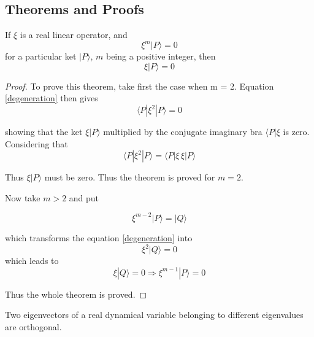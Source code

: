 \subsection{Theorems and Proofs}
\begin{theorem}

If $\xi$ is a real linear operator, and
\begin{equation}
\xi ^m |P \rangle =0
\label{degeneration}
\end{equation}
for a particular ket $|P \rangle$, $m$ being a positive integer, then
\begin{equation*}
\xi |P \rangle =0
\end{equation*}
\label{degenerationtheorem}
\end{theorem}

\begin{proof}

To prove this theorem, take first the case when m = 2. Equation \ref{degeneration} then gives
\begin{equation}
\langle P | \xi ^2 | P \rangle =0
\end{equation}

showing that the ket $\xi|P\rangle$ multiplied by the conjugate imaginary bra $\langle P|\xi$ is zero. Considering that 
\begin{equation*}
\langle P | \xi ^2 | P \rangle  =  \langle P | \xi \, \xi | P \rangle
\end{equation*}

Thus $\xi|P\rangle$ must be zero. Thus the theorem is proved for $m = 2$.

Now take $m > 2$ and put

\begin{equation*}
\xi ^{m-2} | P \rangle = |Q \rangle
\end{equation*}

which transforms the equation \ref{degeneration} into
\begin{equation*}
\xi ^2 |Q \rangle = 0
\end{equation*}
which leads to
\begin{equation*}
\xi|Q \rangle =0
\Rightarrow \xi ^{m-1} |P \rangle = 0
\end{equation*}

Thus the whole theorem is proved.

\end{proof}

\begin{theorem}
Two eigenvectors of a real dynamical variable belonging to different eigenvalues are orthogonal.
\label{orthogonaltheorem}
\end{theorem}

